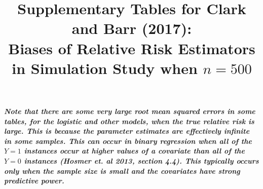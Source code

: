 \documentclass[12pt,a4paper]{article}
\date{}
\begin{document}
\title{Supplementary Tables for Clark and Barr (2017):  \\  
Biases of Relative Risk Estimators in Simulation Study when $n=500$ }


\maketitle



{\bf \it Note that there are some very large root mean squared errors in some tables, for the logistic and other models, when the true relative risk is large. This is because the parameter estimates are effectively infinite in some samples. This can occur in binary regression when all of the $Y=1$ instances occur at higher values of a covariate than all of the $Y=0$ instances (Hosmer et. al 2013, section 4.4). This typically occurs only when the sample size is small and the covariates have strong predictive power.}
\end{document}
